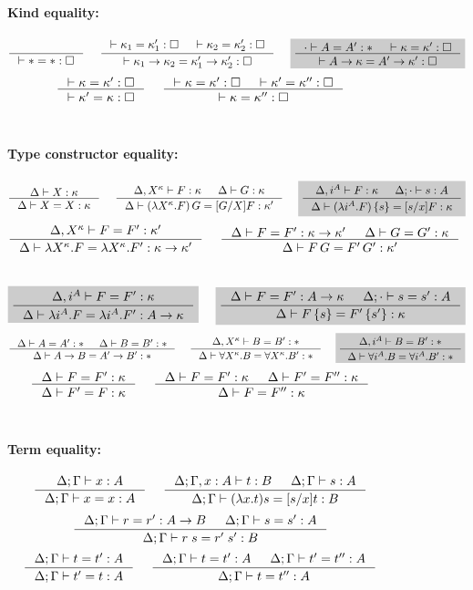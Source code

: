 \begin{figure}
\begin{framed}
\paragraph{Kind equality:} 
\[ \inference{}{|- * = *:\square}
 ~~~~
   \inference{ |- \kappa_1 = \kappa_1' : \square
             & |- \kappa_2 = \kappa_2' : \square }
             {|- \kappa_1 -> \kappa_2 = \kappa_1' -> \kappa_2' : \square}
 ~~~~ \newFi{
   \inference{\cdot |- A=A':* & |- \kappa=\kappa':\square}
             {|- A -> \kappa = A' -> \kappa' : \square} }
\]
\[ \inference{|- \kappa=\kappa':\square}
             {|- \kappa'=\kappa:\square}
 ~~~~
   \inference{ |- \kappa =\kappa' :\square
             & |- \kappa'=\kappa'':\square}
             {|- \kappa=\kappa'':\square}
\]
~\\
\paragraph{Type constructor equality:} 
\[ \inference{\Delta |- X:\kappa }{\Delta |- X=X:\kappa}
 ~~~~
   \inference{\Delta,X^\kappa |- F:\kappa & \Delta |- G:\kappa}
             {\Delta |- (\lambda X^\kappa.F)\,G = [G/X]F:\kappa'}
 ~~~~ \newFi{
   \inference{\Delta,i^A |- F:\kappa & \Delta;\cdot |- s:A}
             {\Delta |- (\lambda i^A.F)\,\{s\} = [s/x]F:\kappa} }
\]
\[ \inference{\Delta,X^\kappa |- F=F' : \kappa'}
             {\Delta |- \lambda X^\kappa.F=\lambda X^\kappa.F':\kappa-> \kappa'}
 ~~~~
   \inference{\Delta |- F=F':\kappa->\kappa' & \Delta |- G=G':\kappa}
             {\Delta |- F\,G = F'\,G' : \kappa'}
\]
 ~~~~
\[ \newFi{
   \inference{\Delta,i^A |- F=F' : \kappa}
             {\Delta |- \lambda i^A.F=\lambda i^A.F' : A -> \kappa} }
 ~~~~ \newFi{
   \inference{\Delta |- F=F':A->\kappa & \Delta;\cdot |- s=s':A}
             {\Delta |- F\,\{s\} = F'\,\{s'\} : \kappa} }
\]
\[ \inference{\Delta |- A=A':* & \Delta |- B=B':*}{\Delta |- A-> B=A'-> B':*}
 ~~~~
   \inference{\Delta,X^\kappa |- B=B':*}
             {\Delta |- \forall X^\kappa.B=\forall X^\kappa.B':*}
 ~~~~ \newFi{
   \inference{\Delta,i^A |- B=B':*}
             {\Delta |- \forall i^A.B=\forall i^A.B':*} }
\]
\[ \inference{\Delta |- F = F' : \kappa}{\Delta |- F' = F : \kappa}
 ~~~~
   \inference{\Delta |- F = F' : \kappa & \Delta |- F' = F'' : \kappa}
             {\Delta |- F = F'' : \kappa}
\]
~\\
\paragraph{Term equality:} 
\[ \inference{\Delta;\Gamma |- x:A}{\Delta;\Gamma |- x=x:A}
 ~~~~
   \inference{\Delta;\Gamma,x:A |- t:B & \Delta;\Gamma |- s:A}
             {\Delta;\Gamma |- (\lambda x.t)s=[s/x]t : B}
\]
\[ \inference{\Delta;\Gamma |- r=r':A-> B & \Delta;\Gamma |- s=s':A}
             {\Delta;\Gamma |- r\;s=r'\;s':B}
\]
\[ \inference{\Delta;\Gamma |- t=t':A}{\Delta;\Gamma |- t'=t:A}
 ~~~~
   \inference{\Delta;\Gamma |- t=t':A & \Delta;\Gamma |- t'=t'':A}
             {\Delta;\Gamma |- t=t'':A}
\]
~\\

\end{framed}
\end{figure}
